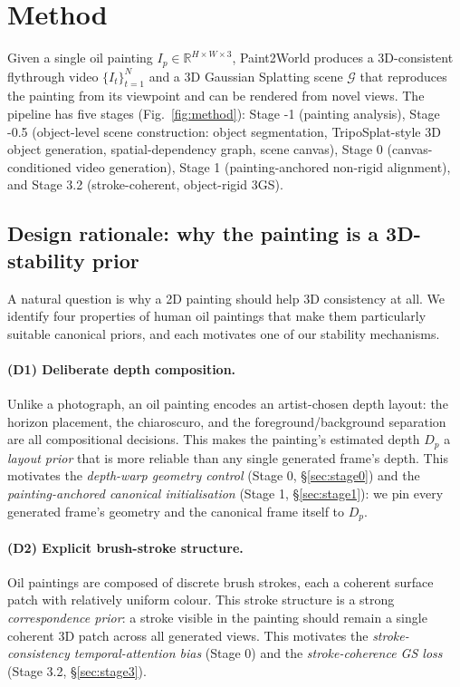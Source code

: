 
\section{Method}
\label{sec:method}

Given a single oil painting $I_p \in \mathbb{R}^{H\times W\times 3}$,
Paint2World produces a 3D-consistent flythrough video
$\{I_t\}_{t=1}^{N}$ and a 3D Gaussian Splatting scene $\mathcal{G}$ that
reproduces the painting from its viewpoint and can be rendered from novel
views. The pipeline has five stages (Fig.~\ref{fig:method}): Stage -1
(painting analysis), Stage -0.5 (object-level scene construction: object
segmentation, TripoSplat-style 3D object generation, spatial-dependency
graph, scene canvas), Stage 0 (canvas-conditioned video generation), Stage 1
(painting-anchored non-rigid alignment), and Stage 3.2 (stroke-coherent,
object-rigid 3GS).

\subsection{Design rationale: why the painting is a 3D-stability prior}
\label{sec:design}

A natural question is why a 2D painting should help 3D consistency at all.
We identify four properties of human oil paintings that make them
particularly suitable canonical priors, and each motivates one of our
stability mechanisms.

\paragraph{(D1) Deliberate depth composition.}
Unlike a photograph, an oil painting encodes an artist-chosen depth layout:
the horizon placement, the chiaroscuro, and the foreground/background
separation are all compositional decisions. This makes the painting's
estimated depth $D_p$ a \emph{layout prior} that is more reliable than any
single generated frame's depth. This motivates the \emph{depth-warp geometry
control} (Stage 0, \S\ref{sec:stage0}) and the \emph{painting-anchored
canonical initialisation} (Stage 1, \S\ref{sec:stage1}): we pin every
generated frame's geometry and the canonical frame itself to $D_p$.

\paragraph{(D2) Explicit brush-stroke structure.}
Oil paintings are composed of discrete brush strokes, each a coherent surface
patch with relatively uniform colour. This stroke structure is a strong
\emph{correspondence prior}: a stroke visible in the painting should remain a
single coherent 3D patch across all generated views. This motivates the
\emph{stroke-consistency temporal-attention bias} (Stage 0) and the
\emph{stroke-coherence GS loss} (Stage 3.2, \S\ref{sec:stage3}).

